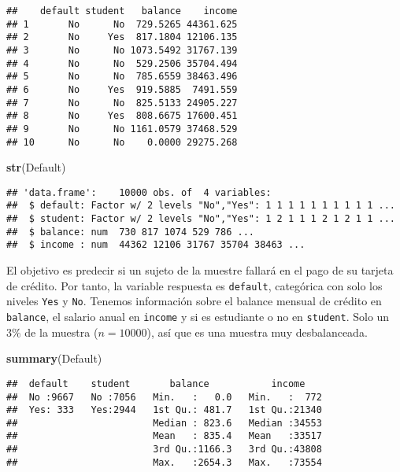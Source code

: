 \documentclass[]{book}
\newenvironment{Shaded}{\begin{snugshade}}{\end{snugshade}}
\newcommand{\KeywordTok}[1]{\textcolor[rgb]{0.13,0.29,0.53}{\textbf{#1}}}
\newcommand{\NormalTok}[1]{#1}
\begin{document}
\begin{verbatim}
##    default student   balance    income
## 1       No      No  729.5265 44361.625
## 2       No     Yes  817.1804 12106.135
## 3       No      No 1073.5492 31767.139
## 4       No      No  529.2506 35704.494
## 5       No      No  785.6559 38463.496
## 6       No     Yes  919.5885  7491.559
## 7       No      No  825.5133 24905.227
## 8       No     Yes  808.6675 17600.451
## 9       No      No 1161.0579 37468.529
## 10      No      No    0.0000 29275.268
\end{verbatim}

\begin{Shaded}
\begin{Highlighting}[]
\KeywordTok{str}\NormalTok{(Default)}
\end{Highlighting}
\end{Shaded}

\begin{verbatim}
## 'data.frame':    10000 obs. of  4 variables:
##  $ default: Factor w/ 2 levels "No","Yes": 1 1 1 1 1 1 1 1 1 1 ...
##  $ student: Factor w/ 2 levels "No","Yes": 1 2 1 1 1 2 1 2 1 1 ...
##  $ balance: num  730 817 1074 529 786 ...
##  $ income : num  44362 12106 31767 35704 38463 ...
\end{verbatim}

El objetivo es predecir si un sujeto de la muestre fallará en el pago de su tarjeta de crédito. Por tanto, la variable respuesta es \texttt{default}, categórica con solo los niveles \texttt{Yes} y \texttt{No}. Tenemos información sobre el balance mensual de crédito en \texttt{balance}, el salario anual en \texttt{income} y si es estudiante o no en \texttt{student}. Solo un \(3\%\) de la muestra (\(n = 10000\)), así que es una muestra muy desbalanceada.

\begin{Shaded}
\begin{Highlighting}[]
\KeywordTok{summary}\NormalTok{(Default)}
\end{Highlighting}
\end{Shaded}

\begin{verbatim}
##  default    student       balance           income     
##  No :9667   No :7056   Min.   :   0.0   Min.   :  772  
##  Yes: 333   Yes:2944   1st Qu.: 481.7   1st Qu.:21340  
##                        Median : 823.6   Median :34553  
##                        Mean   : 835.4   Mean   :33517  
##                        3rd Qu.:1166.3   3rd Qu.:43808  
##                        Max.   :2654.3   Max.   :73554
\end{verbatim}
\end{document}
